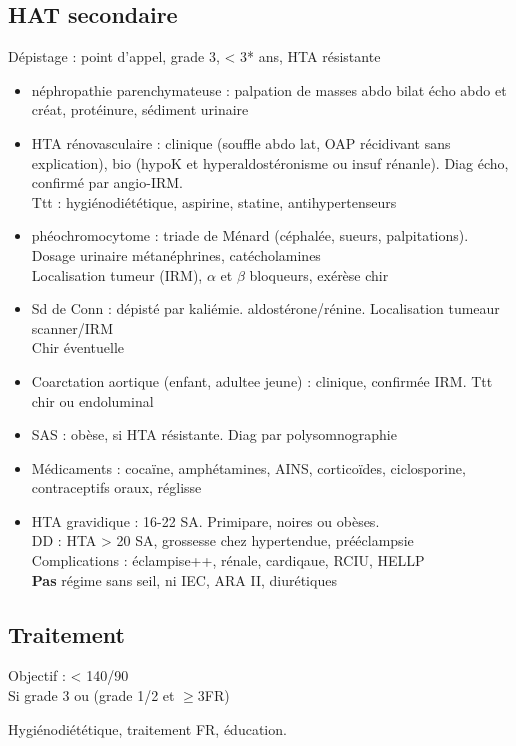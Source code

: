 \documentclass{article}
\begin{document}
\subsection{HAT secondaire}
Dépistage : point d'appel, grade 3, < 3* ans, HTA résistante

\begin{itemize}
  \item néphropathie parenchymateuse : palpation de masses abdo bilat \thus écho
    abdo et créat, protéinure, sédiment urinaire
  \item HTA rénovasculaire : clinique (souffle abdo lat, OAP récidivant sans
    explication), bio (hypoK et hyperaldostéronisme ou insuf rénanle). Diag
    écho, confirmé par angio-IRM. \\
    Ttt : hygiénodiététique, aspirine, statine, antihypertenseurs
  \item phéochromocytome : triade de Ménard (céphalée, sueurs, palpitations).
    Dosage urinaire métanéphrines, catécholamines\\
    Localisation tumeur (IRM), $\alpha$ et $\beta$ bloqueurs, exérèse chir
  \item Sd de Conn : dépisté par kaliémie. \inc aldostérone/rénine. Localisation
    tumeaur scanner/IRM\\
    Chir éventuelle
  \item Coarctation aortique (enfant, adultee jeune) : clinique, confirmée IRM.
    Ttt chir ou endoluminal
  \item SAS : obèse, si HTA résistante. Diag par polysomnographie
  \item Médicaments : cocaïne, amphétamines, AINS, corticoïdes, ciclosporine,
    contraceptifs oraux, réglisse
  \item HTA gravidique : 16-22 SA. Primipare, noires ou obèses.\\
    DD : HTA > 20 SA, grossesse chez hypertendue, prééclampsie\\
    Complications : éclampise++, rénale, cardiqaue, RCIU, HELLP\\
    \textbf{Pas} régime sans seil, ni IEC, ARA II, diurétiques
\end{itemize}

\subsection{Traitement}
Objectif : < 140/90\\
Si grade 3 ou (grade 1/2 et $\ge 3$FR)

Hygiénodiététique, traitement FR, éducation.
\end{document}

